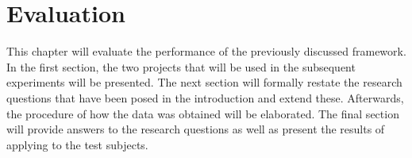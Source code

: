 
\chapter{Evaluation}
\label{ch:evaluation}
This chapter will evaluate the performance of the previously discussed \velocity{} framework. In the first section, the two projects that will be used in the subsequent experiments will be presented. The next section will formally restate the research questions that have been posed in the introduction and extend these. Afterwards, the procedure of how the data was obtained will be elaborated. The final section will provide answers to the research questions as well as present the results of applying \tcp{} to the test subjects.




